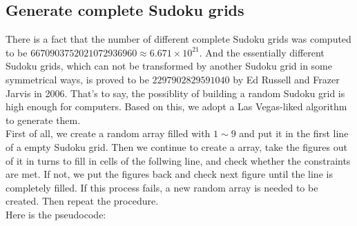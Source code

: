 \documentclass{mcmthesis}
\begin{document}
\subsection{Generate complete Sudoku grids}
\indent There is a fact that the number of different complete Sudoku grids was computed to be $6670903752021072936960 \approx 6.671 \times 10^{21}$. And the essentially different Sudoku grids, which can not be transformed by another Sudoku grid in some symmetrical ways, is proved to be $2297902829591040$ by Ed Russell and Frazer Jarvis in 2006. That's to say, the possiblity of building a random Sudoku grid is high enough for computers. Based on this, we adopt a Las Vegas-liked algorithm to generate them.\\
\indent First of all, we create a random array filled with $1\sim9$ and put it in the first line of a empty Sudoku grid. Then we continue to create a array, take the figures out of it in turns to fill in cells of the follwing line, and check  whether the constraints are met. If not, we put the figures back and check next figure until the line is completely filled. If this process fails, a new random array is needed to be created. Then repeat the procedure. \\
\indent Here is the pseudocode:\\
\end{document}
